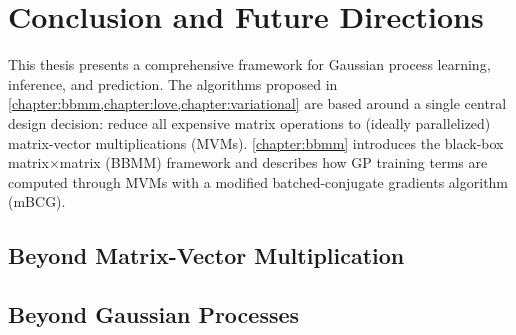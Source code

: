 \chapter{Conclusion and Future Directions}
\label{chapter:discussion}


This thesis presents a comprehensive framework for Gaussian process learning, inference, and prediction.
The algorithms proposed in \cref{chapter:bbmm,chapter:love,chapter:variational} are based around a single central design decision: reduce all expensive matrix operations to (ideally parallelized) matrix-vector multiplications (MVMs).
\cref{chapter:bbmm} introduces the black-box matrix$\times$matrix (BBMM) framework and describes how GP training terms are computed through MVMs with a modified batched-conjugate gradients algorithm (mBCG).


\section{Beyond Matrix-Vector Multiplication}




\section{Beyond Gaussian Processes}

